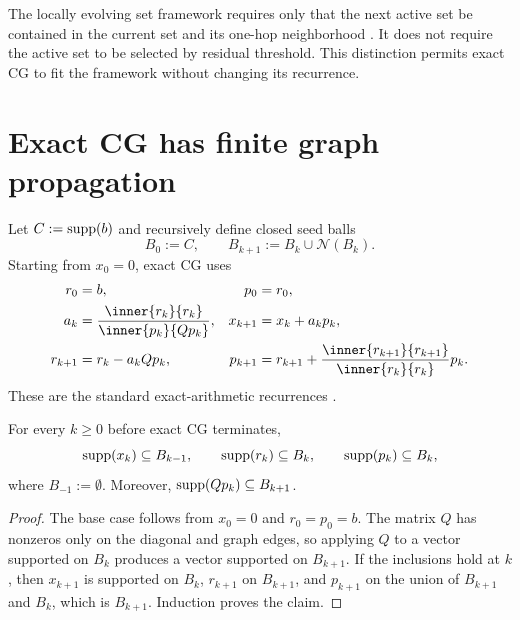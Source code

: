 \documentclass[11pt]{article}
\begin{document}
The locally evolving set framework requires only that the next active set be
contained in the current set and its one-hop neighborhood
\citep{zhou2024iterative}. It does not require the active set to be selected
by residual threshold. This distinction permits exact CG to fit the framework
without changing its recurrence.

\section{Exact CG has finite graph propagation}
\label{sec:finite-propagation}

Let $C:=\operatorname{supp}(b)$ and recursively define closed seed balls
\begin{equation}
 B_0:=C,
 \qquad
 B_{k+1}:=B_k\cup\mathcal N(B_k).
 \label{eq:balls}
\end{equation}
Starting from $x_0=0$, exact CG uses
\begin{align}
 r_0&=b, & p_0&=r_0,\nonumber\\
 a_k&=\frac{\inner{r_k}{r_k}}{\inner{p_k}{Qp_k}},
 &x_{k+1}&=x_k+a_kp_k,\nonumber\\
 r_{k+1}&=r_k-a_kQp_k,
 &p_{k+1}&=r_{k+1}
  +\frac{\inner{r_{k+1}}{r_{k+1}}}{\inner{r_k}{r_k}}p_k.
 \label{eq:cg}
\end{align}
These are the standard exact-arithmetic recurrences
\citep{hestenes1952methods}.

\begin{theorem}
\label{thm:finite-propagation}
For every $k\geq0$ before exact CG terminates,
\begin{equation}
 \operatorname{supp}(x_k)\subseteq B_{k-1},
 \qquad
 \operatorname{supp}(r_k)\subseteq B_k,
 \qquad
 \operatorname{supp}(p_k)\subseteq B_k,
 \label{eq:support-inclusions}
\end{equation}
where $B_{-1}:=\emptyset$. Moreover,
$\operatorname{supp}(Qp_k)\subseteq B_{k+1}$.
\end{theorem}

\begin{proof}
The base case follows from $x_0=0$ and $r_0=p_0=b$. The matrix $Q$ has
nonzeros only on the diagonal and graph edges, so applying $Q$ to a vector
supported on $B_k$ produces a vector supported on $B_{k+1}$. If the
inclusions hold at $k$, then $x_{k+1}$ is supported on $B_k$,
$r_{k+1}$ on $B_{k+1}$, and $p_{k+1}$ on the union of $B_{k+1}$ and $B_k$,
which is $B_{k+1}$. Induction proves the claim.
\end{proof}
\end{document}
